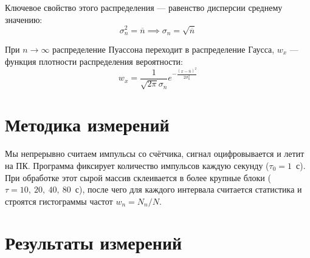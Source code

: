 \documentclass[a4paper, 12pt]{article}
\begin{document}
Ключевое свойство этого распределения — равенство дисперсии среднему значению:
\begin{equation}
    \sigma_n^2 = \overline{n} \implies \sigma_n = \sqrt{\overline{n}}
\end{equation}

При $n\rightarrow \infty$ распределение Пуассона переходит в распределение
Гаусса, $w_x$ --- функция плотности распределения вероятности:
\begin{equation}
	\label{gauss}
	w_x=\frac{1}{\sqrt{2\pi}\sigma_n}
	e^{-{\frac{(x-\overline{n})^2}{2\sigma_n^2}}}
\end{equation}

\section{Методика измерений}



Мы непрерывно считаем импульсы со счётчика, сигнал оцифровывается и летит на ПК.
Программа фиксирует количество импульсов каждую секунду ($\tau_0 = 1$~с).
При обработке этот сырой массив склеивается в более крупные блоки 
($\tau = 10, ~20, ~40, ~80$~с),
после чего для каждого интервала считается статистика
и строятся гистограммы частот $w_n = N_n / N$.

\section{Результаты измерений}
\end{document}
